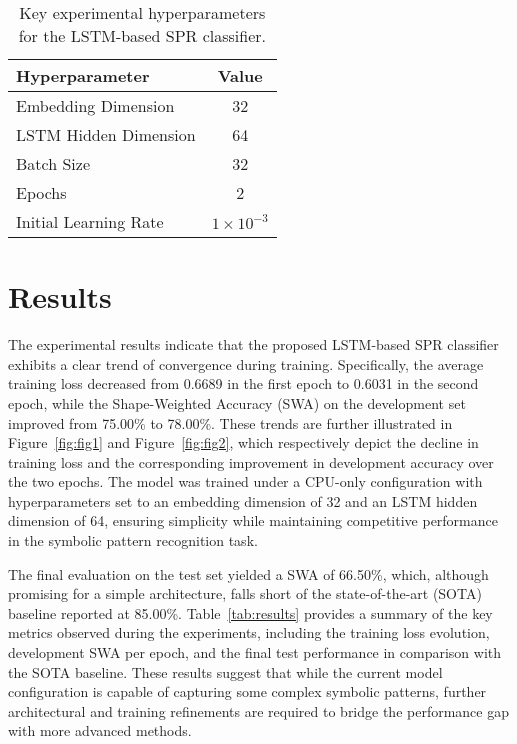 \documentclass{article}
\begin{document}
\begin{table}[h]
\centering
\begin{tabular}{|l|c|}
\hline
\textbf{Hyperparameter} & \textbf{Value} \\ \hline
Embedding Dimension    & 32             \\ \hline
LSTM Hidden Dimension  & 64             \\ \hline
Batch Size             & 32             \\ \hline
Epochs                 & 2              \\ \hline
Initial Learning Rate  & \(1\times10^{-3}\) \\ \hline
\end{tabular}
\caption{Key experimental hyperparameters for the LSTM-based SPR classifier.}
\label{tab:exp_params}
\end{table}

\section{Results}
The experimental results indicate that the proposed LSTM-based SPR classifier exhibits a clear trend of convergence during training. Specifically, the average training loss decreased from 0.6689 in the first epoch to 0.6031 in the second epoch, while the Shape-Weighted Accuracy (SWA) on the development set improved from 75.00\% to 78.00\%. These trends are further illustrated in Figure~\ref{fig:fig1} and Figure~\ref{fig:fig2}, which respectively depict the decline in training loss and the corresponding improvement in development accuracy over the two epochs. The model was trained under a CPU-only configuration with hyperparameters set to an embedding dimension of 32 and an LSTM hidden dimension of 64, ensuring simplicity while maintaining competitive performance in the symbolic pattern recognition task.

The final evaluation on the test set yielded a SWA of 66.50\%, which, although promising for a simple architecture, falls short of the state-of-the-art (SOTA) baseline reported at 85.00\%. Table~\ref{tab:results} provides a summary of the key metrics observed during the experiments, including the training loss evolution, development SWA per epoch, and the final test performance in comparison with the SOTA baseline. These results suggest that while the current model configuration is capable of capturing some complex symbolic patterns, further architectural and training refinements are required to bridge the performance gap with more advanced methods.
\end{document}
